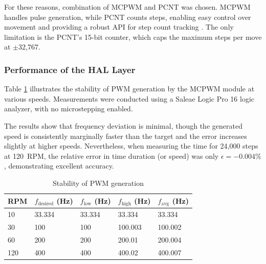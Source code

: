 For these reasons, combination of MCPWM and PCNT was chosen.
MCPWM handles pulse generation, while PCNT counts steps, enabling easy control over movement and providing a robust API for step count tracking \cite{espPCNT}.
The only limitation is the PCNT’s 15-bit counter, which caps the maximum steps per move at $\pm$32,767.


\subsubsection{Performance of the HAL Layer}

Table \ref{tab:performancepwm} illustrates the stability of PWM generation by the MCPWM module at various speeds.
Measurements were conducted using a Saleae Logic Pro 16 logic analyzer, with no microstepping enabled.

The results show that frequency deviation is minimal, though the generated speed is consistently marginally faster than the target and the error increases slightly at higher speeds.
Nevertheless, when measuring the time for 24,000 steps at 120~RPM, the relative error in time duration (or speed) was only $\epsilon = -0.004\%$, demonstrating excellent accuracy.


\begin{table}[h!]
  \centering
  \caption[Stability of PWM generation]{Stability of PWM generation}
  \begin{tabular}{| m{2cm} || m{2.5cm} | m{2.5cm} | m{2.5cm} | m{2.5cm} |}
    \hline
    RPM & $f_{\mathrm{desired}}$ (Hz) & $f_{\mathrm{low}}$ (Hz) & $f_{\mathrm{high}}$ (Hz) & $f_\mathrm{avg}$ (Hz) \\
    \hline
    10  & 33.334                      & 33.334                  & 33.334                   & 33.334                \\
    30  & 100                         & 100                     & 100.003                  & 100.002               \\
    60  & 200                         & 200                     & 200.01                   & 200.004               \\
    120 & 400                         & 400                     & 400.02                   & 400.007               \\
    \hline
  \end{tabular}
  \label{tab:performancepwm}
\end{table}

